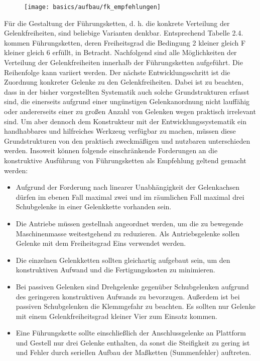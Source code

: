 \begin{figure}[H]
    \centering
    \texttt{[image: basics/aufbau/fk\_empfehlungen]}
\end{figure}

Für die Gestaltung der Führungsketten, d. h. die konkrete Verteilung der Gelenkfreiheiten, sind beliebige Varianten denkbar. Entsprechend Tabelle 2.4. kommen Führungsketten, deren Freiheitsgrad die Bedingung 2 kleiner gleich F kleiner gleich 6 erfüllt, in Betracht. Nachfolgend sind alle Möglichkeiten der Verteilung der Gelenkfreiheiten innerhalb der Führungsketten aufgeführt. Die Reihenfolge kann variiert werden. Der nächste Entwicklungsschritt ist die Zuordnung konkreter Gelenke zu den Gelenkfreiheiten. Dabei ist zu beachten, dass in der bisher vorgestellten Systematik auch solche Grundstrukturen erfasst sind, die einerseits aufgrund einer ungünstigen Gelenkanordnung nicht lauffähig oder andererseits einer zu großen Anzahl von Gelenken wegen praktisch irrelevant sind. Um aber dennoch dem Konstrukteur mit der Entwicklungssystematik ein handhabbares und hilfreiches Werkzeug verfügbar zu machen, müssen diese Grundstrukturen von den praktisch zweckmäßigen und nutzbaren unterschieden werden. Insoweit können folgende einschränkende Forderungen an die konstruktive Ausführung von Führungsketten als Empfehlung geltend gemacht werden:

\begin{itemize}
    \item Aufgrund der Forderung nach linearer Unabhängigkeit der Gelenkachsen dürfen im ebenen Fall maximal zwei und im räumlichen Fall maximal drei Schubgelenke in einer Gelenkkette vorhanden sein.
    \item Die Antriebe müssen gestellnah angeordnet werden, um die zu bewegende Maschinenmasse weitestgehend zu reduzieren. Als Antriebsgelenke sollen Gelenke mit dem Freiheitsgrad Eins verwendet werden.
    \item Die einzelnen Gelenkketten sollten gleichartig aufgebaut sein, um den konstruktiven Aufwand und die Fertigungskosten zu minimieren.
    \item Bei passiven Gelenken sind Drehgelenke gegenüber Schubgelenken aufgrund des geringeren konstruktiven Aufwands zu bevorzugen. Außerdem ist bei passiven Schubgelenken die Klemmgefahr zu beachten. Es sollten nur Gelenke mit einem Gelenkfreiheitsgrad kleiner Vier zum Einsatz kommen.
    \item Eine Führungskette sollte einschließlich der Anschlussgelenke an Plattform und Gestell nur drei Gelenke enthalten, da sonst die Steifigkeit zu gering ist und Fehler durch seriellen Aufbau der Maßketten (Summenfehler) auftreten.
\end{itemize}


